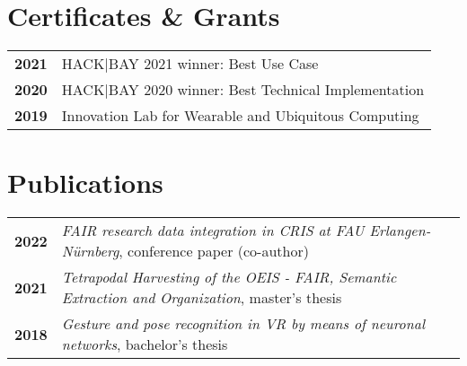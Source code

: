 \documentclass[michiscolours]{hipstercv}
\begin{document}
\begin{paracol}{2}
\begin{minipage}[t]{0.16\textwidth}
 \hfill
{} 

\end{minipage}

\vspace{4em}

\begin{minipage}[t]{0.3\textwidth}
\section*{Certificates \& Grants}
\begin{tabular}{>{\footnotesize\bfseries}r >{\footnotesize}p{}}
    2021 &  HACK|BAY 2021 winner: Best Use Case \\
    2020 &  {HACK|BAY 2020 winner: \newline Best Technical Implementation} \\
    2019 & Innovation Lab for Wearable and Ubiquitous Computing\\

\end{tabular}
\end{minipage}\hfill
\begin{minipage}[t]{0.3\textwidth}
\section*{Publications}
\begin{tabular}{>{\footnotesize\bfseries}r >{\footnotesize}p{}}
   2022 &\emph{FAIR research data integration in CRIS at FAU Erlangen-Nürnberg}, conference paper (co-author) \\
    2021 & \emph{Tetrapodal Harvesting of the OEIS - FAIR, Semantic Extraction and Organization}, master's thesis \\
    2018 & \emph{Gesture and pose recognition in VR by means of neuronal networks}, bachelor's thesis 
\end{tabular}

\end{minipage}
\end{paracol}
\end{document}
